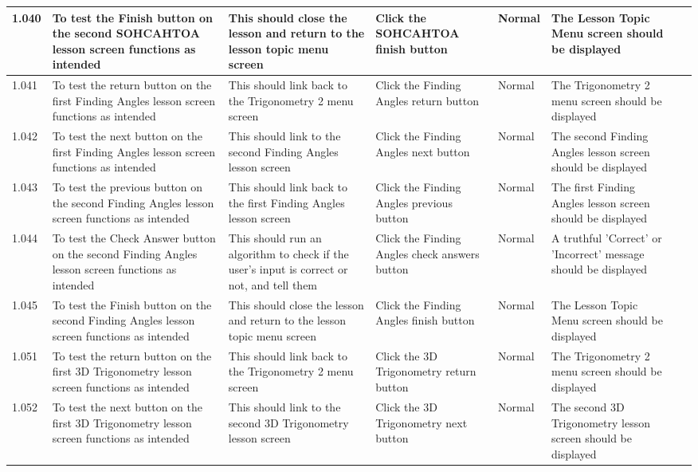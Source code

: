 \begin{landscape}
\begin{center}
\begin{longtable}{|p{1.5cm}|p{2.5cm}|p{2.5cm}|p{2cm}|p{2cm}|p{2cm}|p{2cm}|p{2cm}|}
1.040 & To test the Finish button on the second SOHCAHTOA lesson screen functions as intended & This should close the lesson and return to the lesson topic menu screen & Click the SOHCAHTOA finish button & Normal & The Lesson Topic Menu screen should be displayed & & \\ \hline
1.041 & To test the return button on the first Finding Angles lesson screen functions as intended & This should link back to the Trigonometry 2 menu screen & Click the Finding Angles return button & Normal & The Trigonometry 2 menu screen should be displayed & & \\ \hline
1.042 & To test the next button on the first Finding Angles lesson screen functions as intended & This should link to the second Finding Angles lesson screen & Click the Finding Angles next button & Normal & The second Finding Angles lesson screen should be displayed & & \\ \hline
1.043 & To test the previous button on the second Finding Angles lesson screen functions as intended & This should link back to the first Finding Angles lesson screen & Click the Finding Angles previous button & Normal & The first Finding Angles lesson screen should be displayed & & \\ \hline
1.044 & To test the Check Answer button on the second Finding Angles lesson screen functions as intended & This should run an algorithm to check if the user's input is correct or not, and tell them & Click the Finding Angles check answers button & Normal & A truthful 'Correct' or 'Incorrect' message should be displayed & & \\ \hline
1.045 & To test the Finish button on the second Finding Angles lesson screen functions as intended & This should close the lesson and return to the lesson topic menu screen & Click the Finding Angles finish button & Normal & The Lesson Topic Menu screen should be displayed & & \\ \hline
1.051 & To test the return button on the first 3D Trigonometry lesson screen functions as intended & This should link back to the Trigonometry 2 menu screen & Click the 3D Trigonometry return button & Normal & The Trigonometry 2 menu screen should be displayed & & \\ \hline
1.052 & To test the next button on the first 3D Trigonometry lesson screen functions as intended & This should link to the second 3D Trigonometry lesson screen & Click the 3D Trigonometry next button & Normal & The second 3D Trigonometry lesson screen should be displayed & & \\ \hline

\end{longtable}
\end{center}
\end{landscape}
